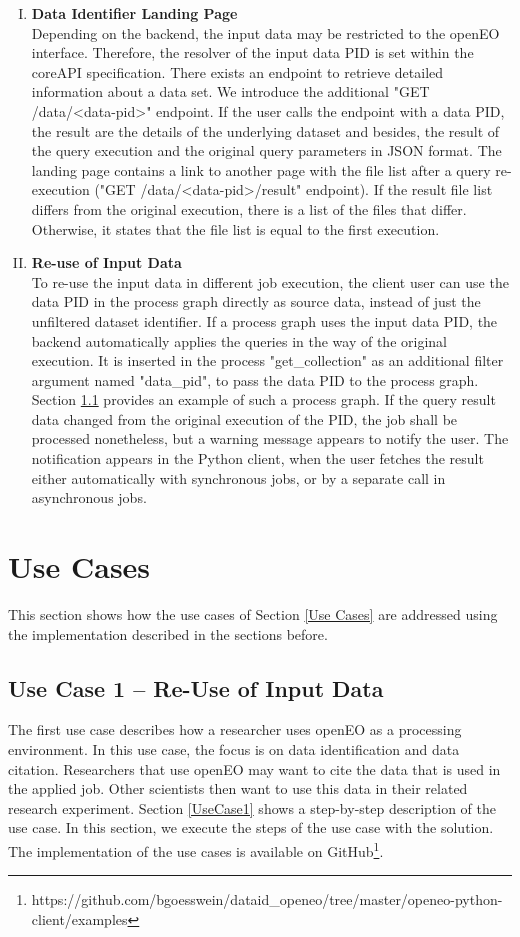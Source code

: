 \documentclass[draft,final]{vutinfth} %
\newcommand{\bgoesswein}[1]{{\color{blue}#1}}
\begin{document}
\begin{enumerate}[I.]
\item \textbf{Data Identifier Landing Page} \\
	Depending on the backend, the input data may be restricted to the openEO interface. Therefore, the resolver of the input data PID is set within the coreAPI specification. There exists an endpoint to retrieve detailed information about a data set. We introduce the additional "GET /data/<data-pid>" endpoint. If the user calls the endpoint with a data PID, the result are the details of the underlying dataset and besides, the result of the query execution and the original query parameters \bgoesswein{in JSON format}. The landing page contains a link to another page with the file list after a query re-execution ("GET /data/<data-pid>/result" endpoint). If the result file list differs from the original execution, there is a list of the files that differ. Otherwise, it states that the file list is equal to the first execution. 

\item \textbf{Re-use of Input Data} \\
	To re-use the input data in different job execution, the client user can use the data PID in the process graph directly as source data, instead of just the unfiltered dataset identifier. If a process graph uses the input data PID, the backend automatically applies the queries in the way of the original execution. It is inserted in the process "get\_collection" as an additional filter argument named "data\_pid", to pass the data PID to the process graph. Section \ref{Implementation:Use Case1} provides an example of such a process graph. If the query result data changed from the original execution of the PID, the job shall be processed nonetheless, but a warning message appears to notify the user. \bgoesswein{The notification appears in the Python client, when the user fetches the result either automatically with synchronous jobs, or by a separate call in asynchronous jobs.}   
\end{enumerate}

\section{Use Cases}
This section shows how the use cases of Section \ref{Use Cases} are addressed using the implementation described in the sections before.

\subsection{Use Case 1 – Re-Use of Input Data}\label{Implementation:Use Case1}
The first use case describes how a researcher uses openEO as a processing environment. In this use case, the focus is on data identification and data citation. Researchers that use openEO may want to cite the data that is used in the applied job. Other scientists then want to use this data in their related research experiment. Section \ref{UseCase1} shows a step-by-step description of the use case. In this section, we execute the steps of the use case with the solution. The implementation of the use cases is available on GitHub\footnote{https://github.com/bgoesswein/dataid\_openeo/tree/master/openeo-python-client/examples}.
\end{document}
